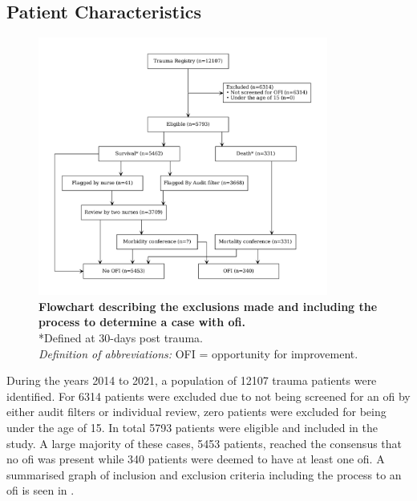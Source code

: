 \documentclass[12pt, a4paper]{article}
\begin{document}
\subsection{Patient Characteristics}
\begin{figure}[ht]
    \centering
    \includegraphics[width=0.85\textwidth]{figures/flowchart.pdf}
    \caption{\textbf{Flowchart describing the exclusions made and including the process to determine a case with \acrshort{ofi}.}\\
        *Defined at 30-days post trauma.\\
        \textit{Definition of abbreviations:} OFI = opportunity for improvement.}
    \label{fig:flowchart}
\end{figure}
During the years 2014 to 2021, a population of \num{12107} trauma patients were identified. For \num{6314} patients were excluded due to not being screened for an \acrshort{ofi} by either audit filters or individual review, zero patients were excluded for being under the age of 15. In total \num{5793} patients were eligible and included in the study. A large majority of these cases, \num{5453} patients, reached the consensus that no \acrshort{ofi} was present while \num{340} patients were deemed to have at least one \acrshort{ofi}. A summarised graph of inclusion and exclusion criteria including the process to an \acrshort{ofi} is seen in .
\end{document}
